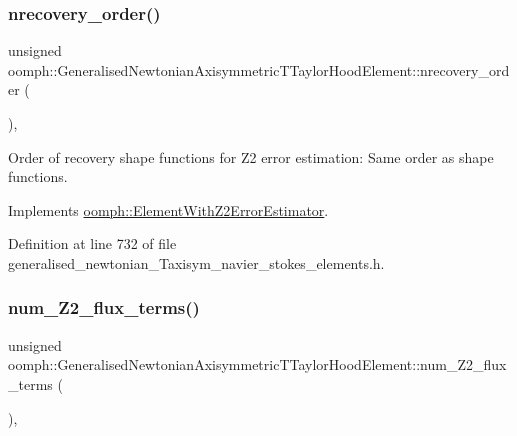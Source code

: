 \subsubsection{\texorpdfstring{nrecovery\+\_\+order()}{nrecovery\_order()}}
{\footnotesize\ttfamily unsigned oomph\+::\+Generalised\+Newtonian\+Axisymmetric\+T\+Taylor\+Hood\+Element\+::nrecovery\+\_\+order (\begin{DoxyParamCaption}{ }\end{DoxyParamCaption})\hspace{0.3cm}{\ttfamily [inline]}, {\ttfamily [virtual]}}



Order of recovery shape functions for Z2 error estimation\+: Same order as shape functions. 



Implements \hyperlink{classoomph_1_1ElementWithZ2ErrorEstimator_af39480835bd3e0f6b2f4f7a9a4044798}{oomph\+::\+Element\+With\+Z2\+Error\+Estimator}.



Definition at line 732 of file generalised\+\_\+newtonian\+\_\+\+Taxisym\+\_\+navier\+\_\+stokes\+\_\+elements.\+h.

\mbox{\label{classoomph_1_1GeneralisedNewtonianAxisymmetricTTaylorHoodElement_ad607e2e88bfcab444870e8d6b4e4b08a}} 
\subsubsection{\texorpdfstring{num\+\_\+\+Z2\+\_\+flux\+\_\+terms()}{num\_Z2\_flux\_terms()}}
{\footnotesize\ttfamily unsigned oomph\+::\+Generalised\+Newtonian\+Axisymmetric\+T\+Taylor\+Hood\+Element\+::num\+\_\+\+Z2\+\_\+flux\+\_\+terms (\begin{DoxyParamCaption}{ }\end{DoxyParamCaption})\hspace{0.3cm}{\ttfamily [inline]}, {\ttfamily [virtual]}}



